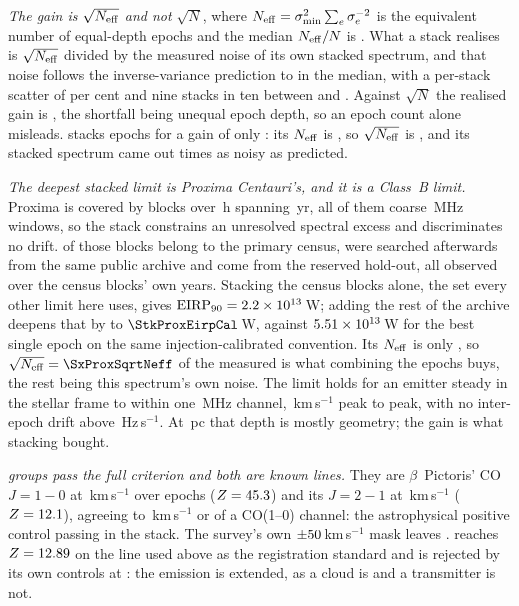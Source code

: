 \emph{The gain is $\sqrt{N_{\rm eff}}$ and not $\sqrt{N}$}, where
$N_{\rm eff}=\sigma_{\min}^{2}\sum_e\sigma_e^{-2}$ is the equivalent number of
equal-depth epochs and the median $N_{\rm eff}/N$ is \StkNeffFrac. What a
stack realises is $\sqrt{N_{\rm eff}}$ divided by the measured noise of its
own stacked spectrum, and that noise follows the inverse-variance prediction
to \StkGainVsNeff{} in the median, with a per-stack scatter of
\StkMadZScatterPct{} per cent and nine stacks in ten between \SzNoiseLo{} and
\SzNoiseHi. Against $\sqrt{N}$ the realised gain is \StkGainVsN, the
shortfall being unequal epoch depth, so an epoch count alone misleads.
\StkWorstStar{} stacks \StkWorstN{} epochs for a gain of only \StkWorstGain:
its $N_{\rm eff}$ is \StkWorstNeff, so $\sqrt{N_{\rm eff}}$ is
\SzWorstSqrtNeff, and its stacked spectrum came out \SzWorstNoise{} times as
noisy as predicted.

\emph{The deepest stacked limit is Proxima Centauri's, and it is a Class~B
limit.} Proxima is covered by \StkProxN{} blocks over \StkProxHours\,h
spanning \StkProxSpanYr\,yr, all of them coarse \ChanBModeMHz\,MHz windows,
so the stack constrains an unresolved spectral excess and discriminates no
drift. \SxProxEbCensus{} of those blocks belong to the primary census,
\SzProxEbSearched{} were searched afterwards from the same public archive and
\SzProxEbHold{} come from the reserved hold-out, all observed over the census
blocks' own years. Stacking the census blocks alone, the set every
other limit here uses, gives
$\mathrm{EIRP}_{90}=2.2\times10^{13}$\,W; adding the rest of the
archive deepens that by \SzProxDeepen{} to $\StkProxEirpCal$\,W, against
$5.51 \times 10^{13}$\,W for the best single epoch on the same
injection-calibrated convention. Its $N_{\rm eff}$ is only \StkProxNeff, so
$\sqrt{N_{\rm eff}}=\SxProxSqrtNeff$ of the measured \StkProxGain{} is what
combining the epochs buys, the rest being this spectrum's own noise. The limit
holds for an emitter steady in the stellar frame to within one
\ChanBModeMHz\,MHz channel,
\StkProxTolKms\,km\,s$^{-1}$ peak to peak, with no inter-epoch drift above
\StkProxDriftHzS\,Hz\,s$^{-1}$. At \StkProxDistPc\,pc that depth is mostly
geometry; the gain is what stacking bought.

\emph{\StkNSurvive{} groups pass the full criterion and both are known
lines.} They are $\beta$~Pictoris' CO $J=1\!-\!0$ at
\StkBpCoOneOff\,km\,s$^{-1}$ over \StkBpCoOneN{} epochs ($Z=45.3$)
and its $J=2\!-\!1$ at \StkBpCoTwoOff\,km\,s$^{-1}$ ($Z=12.1$),
agreeing to \StkBpCrossKms\,km\,s$^{-1}$ or \StkBpCrossChan{} of a CO(1--0)
channel: the astrophysical positive control passing in the stack. The
survey's own $\pm50$\,km\,s$^{-1}$ mask leaves
\StkUnattrClause. \StkPersistLineStar{} reaches
$Z=12.89$ on the line used above as the registration standard and is
rejected by its own controls at \StkPersistLineCtrl: the emission is extended,
as a cloud is and a transmitter is not.

